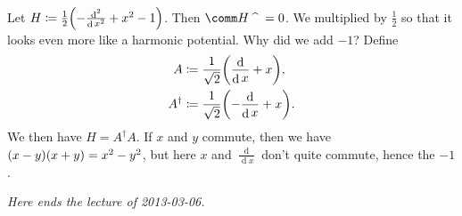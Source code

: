 \documentclass[10pt]{article}
\DeclarePairedDelimiter\of{\lparen}{\rparen}
\DeclareMathOperator{\diffd}{d}
\newcommand\ft\widehat
\newcommand{\adj}{^\dagger}
\newcommand\fstderiv[2][]{\frac{\diffd #1}{\diffd #2}}
\newcommand\nthderiv[3][]{\frac{\diffd^#3 #1}{{\diffd #2}^#3}}
\begin{document}
  Let $H \coloneqq \frac{1}{2}\of*{-\nthderiv{x}{2}+x^2-1}$. Then $\comm H {\ft\quad}=0$. We multiplied by $\frac{1}{2}$ so that it looks even more like a harmonic potential. Why did we add $-1$? Define
  \begin{align*}
    A &\coloneqq \frac{1}{\sqrt 2}\of*{\fstderiv{x} + x},\\
    A\adj &\coloneqq \frac{1}{\sqrt 2}\of*{-\fstderiv{x} + x}.
  \end{align*}
  We then have $H = A\adj A$. If $x$ and $y$ commute, then we have $\of*{x-y}\of*{x+y}=x^2-y^2$, but here $x$ and $\fstderiv{x}$ don't quite commute, hence the $-1$.

\emph{Here ends the lecture of 2013-03-06.}
\end{document}
